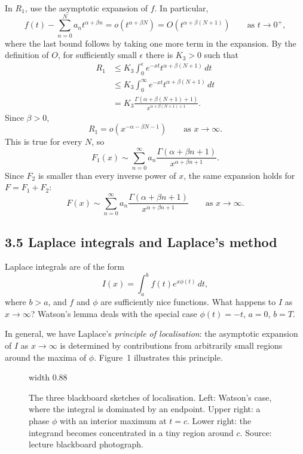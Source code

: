 \documentclass[11pt,a4paper]{article}
\begin{document}
In $R_1$, use the asymptotic expansion of $f$. In particular,
\[
    f(t)-\sum_{n=0}^N a_n t^{\alpha+\beta n}
    =o(t^{\alpha+\beta N})
    =O(t^{\alpha+\beta(N+1)})
    \qquad\text{as }t\to0^+,
\]
where the last bound follows by taking one more term in the expansion.
By the definition of $O$, for sufficiently small $\epsilon$ there is
$K_3>0$ such that
\begin{align*}
    R_1
    &\leq K_3\int_0^\epsilon e^{-xt}t^{\alpha+\beta(N+1)}\,dt\\
    &\leq K_3\int_0^\infty e^{-xt}t^{\alpha+\beta(N+1)}\,dt\\
    &=K_3\frac{\Gamma(\alpha+\beta(N+1)+1)}
    {x^{\alpha+\beta(N+1)+1}}.
\end{align*}
Since $\beta>0$,
\[
    R_1=o\!\left(x^{-\alpha-\beta N-1}\right)
    \qquad\text{as }x\to\infty.
\]
This is true for every $N$, so
\[
    F_1(x)\sim\sum_{n=0}^\infty
    a_n\frac{\Gamma(\alpha+\beta n+1)}{x^{\alpha+\beta n+1}}.
\]
Since $F_2$ is smaller than every inverse power of $x$, the same expansion
holds for $F=F_1+F_2$:
\[
    F(x)\sim\sum_{n=0}^\infty
    a_n\frac{\Gamma(\alpha+\beta n+1)}{x^{\alpha+\beta n+1}}
    \qquad\text{as }x\to\infty.
\]

\subsection*{3.5 Laplace integrals and Laplace's method}

Laplace integrals are of the form
\[
    I(x)=\int_a^b f(t)e^{x\phi(t)}\,dt,
\]
where $b>a$, and $f$ and $\phi$ are sufficiently nice functions.
What happens to $I$ as $x\to\infty$?
Watson's lemma deals with the special case $\phi(t)=-t$, $a=0$, $b=T$.

In general, we have Laplace's \emph{principle of localisation}:
the asymptotic expansion of $I$ as $x\to\infty$ is determined by
contributions from arbitrarily small regions around the maxima of $\phi$.
Figure~1 illustrates this principle.
\begin{figure}[htbp]
    \centering
    \pdfximage width 0.88\linewidth {figures/asymptotic-lecture5-localisation.jpg}
    \pdfrefximage\pdflastximage
    \caption{The three blackboard sketches of localisation. Left: Watson's
    case, where the integral is dominated by an endpoint. Upper right:
    a phase $\phi$ with an interior maximum at $t=c$. Lower right:
    the integrand becomes concentrated in a tiny region around $c$.
    Source: lecture blackboard photograph.}
    \label{fig:am-lecture5-localisation}
\end{figure}
\end{document}
